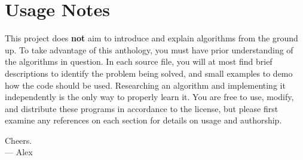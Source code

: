 \section*{Usage Notes}

This project does \textbf{not} aim to introduce and explain algorithms from the ground up. To take advantage of this anthology, you must have prior understanding of the algorithms in question. In each source file, you will at most find brief descriptions to identify the problem being solved, and small examples to demo how the code should be used. Researching an algorithm and implementing it independently is the only way to properly learn it. You are free to use, modify, and distribute these programs in accordance to the license, but please first examine any references on each section for details on usage and authorship.

\begin{flushright}
Cheers.\\
--- Alex\\[0.3\baselineskip]
\end{flushright}

